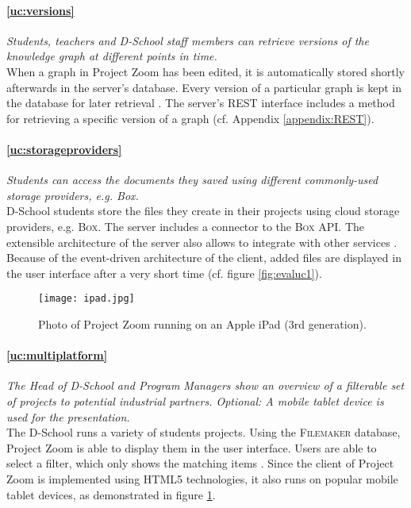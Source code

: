 \paragraph{\ref{uc:versions}} \textit{Students, teachers and D-School staff members can retrieve versions of the knowledge graph at different points in time.}\\
When a graph in Project Zoom has been edited, it is automatically stored shortly afterwards in the server's database. Every version of a particular graph is kept in the database for later retrieval \cite{Bocklisch_2013}. The server's REST interface includes a method for retrieving a specific version of a graph (cf. Appendix \ref{appendix:REST}).

\paragraph{\ref{uc:storageproviders}} \textit{Students can access the documents they saved using different commonly-used storage pro\-vi\-ders, e.g. Box.}\\
D-School students store the files they create in their projects using cloud storage providers, e.g. \textsc{Box}. The server includes a connector to the \textsc{Box} API. The extensible architecture of the server also allows to integrate with other services \cite{Werkmeister_2013}. Because of the event-driven architecture of the client, added files are displayed in the user interface after a very short time (cf. figure \ref{fig:evaluc1}).

\begin{figure}
\begin{center}
\texttt{[image: ipad.jpg]}
\caption{Photo of Project Zoom running on an Apple iPad (3rd generation).}
\label{fig:evaluc6}
\end{center}
\end{figure}

\paragraph{\ref{uc:multiplatform}} \textit{The Head of D-School and Program Managers show an overview of a filterable set of pro\-jects to potential industrial partners. Optional:  A mobile tablet device is used for the presentation.}\\
The D-School runs a variety of students projects. Using the \textsc{Filemaker} database, Project Zoom is able to display them in the user interface. Users are able to select a filter, which only shows the matching items \cite{Dieckhoff_2013}. Since the client of Project Zoom is implemented using HTML5 technologies, it also runs on popular mobile tablet devices, as demonstrated in figure \ref{fig:evaluc6}.


